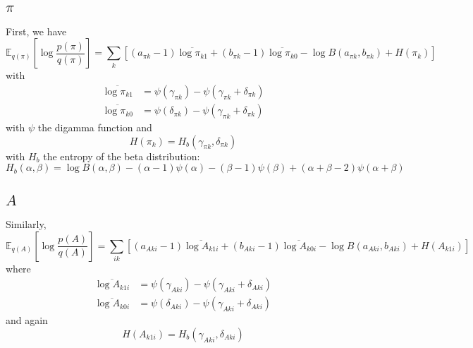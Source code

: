\documentclass[11pt]{article}
\begin{document}
\subsection{$\pi$}
First, we have
\begin{equation}
    \mathbb{E}_{q(\pi)} \left[\log \frac{p(\pi)}{q(\pi)} \right] = \sum_k \left[(a_{\pi k} - 1)\overline{\log \pi_{k1}} + (b_{\pi k} - 1) \overline{\log \pi_{k0}} - \log B(a_{\pi k}, b_{\pi k}) + H(\pi_k) \right]
\end{equation}
with
\begin{align}
    \overline{\log \pi_{k1}} &= \psi(\gamma_{\pi k}) - \psi(\gamma_{\pi k} + \delta_{\pi k}) \\
    \overline{\log \pi_{k0}} &= \psi(\delta_{\pi k}) - \psi(\gamma_{\pi k} + \delta_{\pi k})
\end{align}
with $\psi$ the digamma function and 
\begin{equation}
    H(\pi_k) = H_b(\gamma_{\pi k}, \delta_{\pi k})
\end{equation}
with $H_b$ the entropy of the beta distribution:
\begin{equation}
    H_b(\alpha, \beta) = \log B(\alpha, \beta) - (\alpha - 1) \psi(\alpha) - (\beta - 1) \psi(\beta) + (\alpha + \beta - 2)\psi(\alpha + \beta)
\end{equation}

\subsection{$A$} 
Similarly,
\begin{equation}
    \mathbb{E}_{q(A)} \left[\log \frac{p(A)}{q(A)} \right] = 
\sum_{ik} \left[ (a_{Aki} - 1) \overline{\log A_{k1i}} + (b_{Aki} - 1) \overline{\log A_{k0i}} - \log B(a_{Aki}, b_{Aki}) + H(A_{k1i}) \right]
\end{equation}
where 
\begin{align}
    \overline{\log A_{k1i}} &= \psi(\gamma_{Aki}) - \psi(\gamma_{Aki} + \delta_{Aki}) \\
    \overline{\log A_{k0i}} &= \psi(\delta_{Aki}) - \psi(\gamma_{Aki} + \delta_{Aki})
\end{align}
and again
\begin{equation}
    H(A_{k1i}) = H_b(\gamma_{Aki}, \delta_{Aki})
\end{equation}
\end{document}
